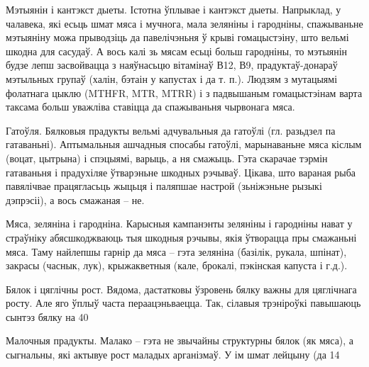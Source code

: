 Мэтыянін і кантэкст дыеты.
Істотна ўплывае і кантэкст дыеты. Напрыклад, у чалавека, які есьць шмат мяса і мучнога, мала зеляніны і гародніны, спажываньне мэтыяніну можа прыводзіць да павелічэньня ў крыві гомацыстэіну, што вельмі шкодна для сасудаў. А вось калі зь мясам есьці больш гародніны, то мэтыянін будзе лепш засвойвацца з наяўнасьцю вітамінаў В12, В9, прадуктаў-донараў мэтыльных групаў (халін, бэтаін у капустах і да т. п.). Людзям з мутацыямі фолатнага цыклю (MTHFR, MTR, MTRR) і з падвышаным гомацыстэінам варта таксама больш уважліва ставіцца да спажываньня чырвонага мяса.

Гатоўля.
Бялковыя прадукты вельмі адчувальныя да гатоўлі (гл. разьдзел па гатаваньні). Аптымальныя ашчадныя спосабы гатоўлі, марынаваньне мяса кіслым (воцат, цытрына) і спэцыямі, варыць, а ня смажыць. Гэта скарачае тэрмін гатаваньня і прадухіляе ўтварэньне шкодных рэчываў. Цікава, што вараная рыба павялічвае працягласьць жыцьця і паляпшае настрой (зьніжэньне рызыкі дэпрэсіі), а вось смажаная – не.

Мяса, зеляніна і гародніна.
Карысныя кампанэнты зеляніны і гародніны нават у страўніку абясшкоджваюць тыя шкодныя рэчывы, якія ўтворацца пры смажаньні мяса. Таму найлепшы гарнір да мяса – гэта зеляніна (базілік, рукала, шпінат), закрасы (часнык, лук), крыжакветныя (кале, брокалі, пэкінская капуста і г.д.).

Бялок і цяглічны рост.
Вядома, дастатковы ўзровень бялку важны для цяглічнага росту. Але яго ўплыў часта пераацэньваецца. Так, сілавыя трэніроўкі павышаюць сынтэз бялку на 40%

Малочныя прадукты.
Малако – гэта не звычайны структурны бялок (як мяса), а сыгнальны, які актывуе рост маладых арганізмаў. У ім шмат лейцыну (да 14%

